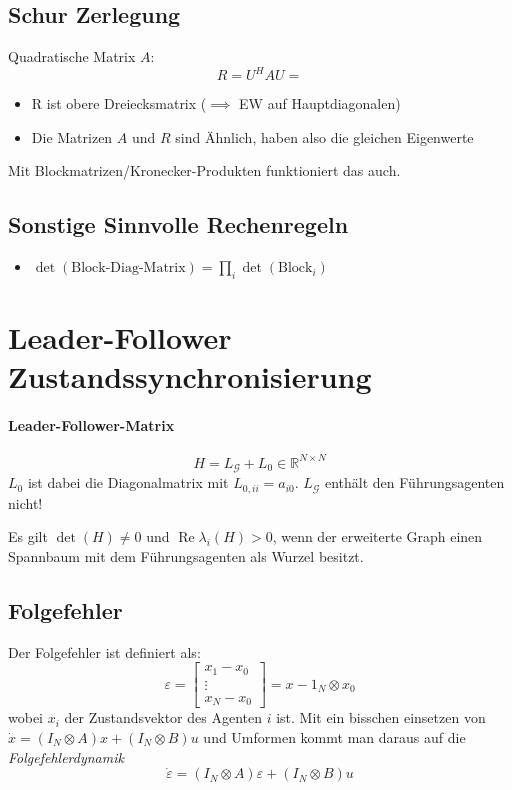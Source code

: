 \subsection{Schur Zerlegung}
Quadratische Matrix $A$:
\begin{equation}
    R=U^H A U = 
\end{equation}
\begin{itemize}
    \item R ist obere Dreiecksmatrix ($\implies$ EW auf Hauptdiagonalen)
    \item Die Matrizen $A$ und $R$ sind Ähnlich, haben also die gleichen Eigenwerte
\end{itemize}

Mit Blockmatrizen/Kronecker-Produkten funktioniert das auch.

\subsection{Sonstige Sinnvolle Rechenregeln}
\begin{itemize}
    \item $\det(\text{Block-Diag-Matrix}) = \prod_i \det(\text{Block}_i)$
\end{itemize}

\section{Leader-Follower Zustandssynchronisierung}
\paragraph{Leader-Follower-Matrix}
\label{par:leader_follower_matrix}
\begin{equation}
    \tag{Leader-Follower-Matrix}
    H = L_\mathcal{G} + L_0 \in \mathbb{R}^{N\times N}
    \label{eqn:lf_matrix}
\end{equation}
$L_0$ ist dabei die Diagonalmatrix mit $L_{0,ii}=a_{i0}$.
$L_\mathcal{G}$ enthält den Führungsagenten nicht!

Es gilt $\det(H) \neq 0$ und $\operatorname{Re}\lambda_i(H) > 0$,
wenn der erweiterte Graph einen Spannbaum mit dem Führungsagenten als
Wurzel besitzt.

\subsection{Folgefehler}
Der Folgefehler ist definiert als:
\begin{equation}
    \varepsilon = \begin{bmatrix}
        x_1-x_0 \\
        \vdots \\
        x_N-x_0
    \end{bmatrix}
    = x-1_N \otimes x_0
\end{equation}
wobei $x_i$ der Zustandsvektor des Agenten $i$ ist.
Mit ein bisschen einsetzen von $\dot{x} = (I_N \otimes A)x + (I_N \otimes B)u$
und Umformen kommt man daraus auf die \emph{Folgefehlerdynamik}
\begin{equation}
    \dot{\varepsilon} = (I_N \otimes A)\varepsilon + (I_N \otimes B)u
\end{equation}

